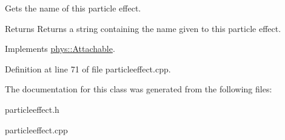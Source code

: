 Gets the name of this particle effect. 

\begin{DoxyReturn}{Returns}
Returns a string containing the name given to this particle effect. 
\end{DoxyReturn}


Implements \hyperlink{classphys_1_1Attachable_a56d2f5a6f17c14ff0c1d9906d17b0f52}{phys::Attachable}.



Definition at line 71 of file particleeffect.cpp.



The documentation for this class was generated from the following files:\begin{DoxyCompactItemize}
\item 
particleeffect.h\item 
particleeffect.cpp\end{DoxyCompactItemize}
